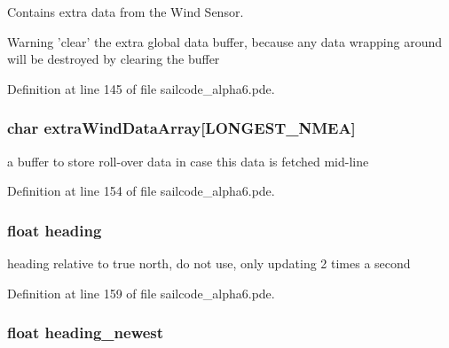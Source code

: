 \-Contains extra data from the \-Wind \-Sensor. 

\begin{DoxyWarning}{\-Warning}
'clear' the extra global data buffer, because any data wrapping around will be destroyed by clearing the buffer 
\end{DoxyWarning}


\-Definition at line 145 of file sailcode\-\_\-alpha6.\-pde.

\hypertarget{group__group1_ga5a0e345949d7a23900298d33d0be150c}{
\subsubsection[{extra\-Wind\-Data\-Array}]{\setlength{\rightskip}{0pt plus 5cm}char {\bf extra\-Wind\-Data\-Array}\mbox{[}\-L\-O\-N\-G\-E\-S\-T\-\_\-\-N\-M\-E\-A\mbox{]}}}
\label{group__group1_ga5a0e345949d7a23900298d33d0be150c}


a buffer to store roll-\/over data in case this data is fetched mid-\/line 



\-Definition at line 154 of file sailcode\-\_\-alpha6.\-pde.

\hypertarget{group__group1_gac5682e48513a771560df50e3b213e61a}{
\subsubsection[{heading}]{\setlength{\rightskip}{0pt plus 5cm}float {\bf heading}}}
\label{group__group1_gac5682e48513a771560df50e3b213e61a}


heading relative to true north, do not use, only updating 2 times a second 



\-Definition at line 159 of file sailcode\-\_\-alpha6.\-pde.

\hypertarget{group__group1_ga3c596663ba52aec96df1f504772914be}{
\subsubsection[{heading\-\_\-newest}]{\setlength{\rightskip}{0pt plus 5cm}float {\bf heading\-\_\-newest}}}
\label{group__group1_ga3c596663ba52aec96df1f504772914be}


